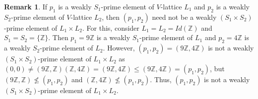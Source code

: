 \documentclass[10pt,twoside,a4paper]{amsart}
\numberwithin{equation}{section}
\theoremstyle{plain}
\newtheorem{lem}{Lemma}[section]
\theoremstyle{definition}
\newtheorem{rem}[lem]{Remark}
\begin{document}

\begin{rem}%
	If $p_1$ is a weakly $S_1$-prime element of $V$-lattice $L_1$ and $p_2$ is a weakly $S_2$-prime element of $V$-lattice $L_2$, then $(p_1,p_2)$ need not be a weakly $(S_1\times S_2)$-prime element of $L_1\times L_2$. For this, consider $L_1=L_2=Id(\mathbb{Z})$ and $S_1=S_2=\{\mathbb{Z}\}$. Then $p_1=9\mathbb{Z}$ is a weakly $S_1$-prime element of $L_1$ and $p_2=4\mathbb{Z}$ is a weakly $S_2$-prime element of $L_2$. However, $(p_1,p_2)=(9\mathbb{Z},4\mathbb{Z})$ is not a weakly $(S_1\times S_2)$-prime element of $L_1\times L_2$ as $(0,0)\neq (9\mathbb{Z},\mathbb{Z})(\mathbb{Z},4\mathbb{Z})=(9\mathbb{Z},4\mathbb{Z})\leq (9\mathbb{Z},4\mathbb{Z})=(p_1,p_2)$, but $(9\mathbb{Z},\mathbb{Z})\nleq (p_1,p_2)$ and $(\mathbb{Z},4\mathbb{Z})\nleq (p_1,p_2)$. Thus, $(p_1,p_2)$ is not a weakly $(S_1\times S_2)$-prime element of $L_1\times L_2$.
\end{rem}
\end{document}
